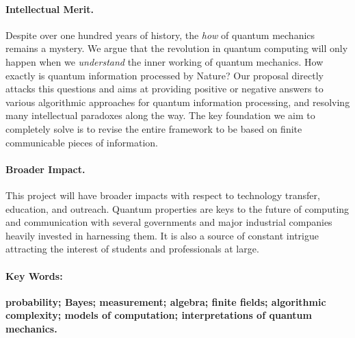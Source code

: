 \documentclass[11pt]{article}
\begin{document}
\paragraph*{Intellectual Merit.} Despite over one hundred years of
history, the \emph{how} of quantum mechanics remains a mystery. We
argue that the revolution in quantum computing will only happen when
we \emph{understand} the inner working of quantum mechanics. How
exactly is quantum information processed by Nature? Our proposal
directly attacks this questions and aims at providing positive or
negative answers to various algorithmic approaches for quantum
information processing, and resolving many intellectual paradoxes
along the way. The key foundation we aim to completely solve is to
revise the entire framework to be based on finite communicable pieces
of information.

\paragraph*{Broader Impact.} This project will have broader impacts
with respect to technology transfer, education, and outreach. Quantum
properties are keys to the future of computing and communication with
several governments and major industrial companies heavily invested in
harnessing them. It is also a source of constant intrigue attracting
the interest of students and professionals at large.

\paragraph*{Key Words:} \textbf{probability; Bayes; measurement;
  algebra; finite fields; algorithmic complexity; models of
  computation; interpretations of quantum mechanics.}
\end{document}
